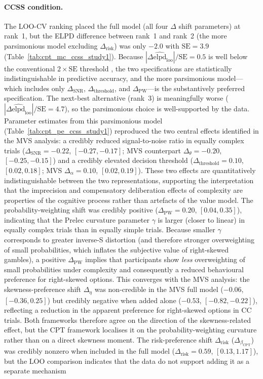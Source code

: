 \documentclass[man,floatsintext]{apa7}
\begin{document}
\paragraph{CCSS condition.} The LOO-CV ranking placed the full model (all four $\Delta$ shift parameters) at rank~1, but the ELPD difference between rank~1 and rank~2 (the more parsimonious model excluding $\Delta_{\text{risk}}$) was only $-2.0$ with $\mathrm{SE} = 3.9$ (Table~\ref{tab:cpt_mc_ccss_study1}). Because $|\Delta\widehat{\mathrm{elpd}}_{\mathrm{loo}}|/\mathrm{SE} = 0.5$ is well below the conventional $2 \times \mathrm{SE}$ threshold \parencite{vehtari_practical_2017}, the two specifications are statistically indistinguishable in predictive accuracy, and the more parsimonious model---which includes only $\Delta_{\text{SNR}}$, $\Delta_{\text{threshold}}$, and $\Delta_{\text{PW}}$---is the substantively preferred specification. The next-best alternative (rank~3) is meaningfully worse ($|\Delta\widehat{\mathrm{elpd}}_{\mathrm{loo}}|/\mathrm{SE} = 4.7$), so the parsimonious choice is well-supported by the data. Parameter estimates from this parsimonious model (Table~\ref{tab:cpt_pe_ccss_study1}) reproduced the two central effects identified in the MVS analysis: a credibly reduced signal-to-noise ratio in equally complex trials (\textbf{$\Delta_{\text{SNR}} = -0.22$}, $[-0.27, -0.17]$; MVS counterpart $\Delta_\theta = -0.20$, $[-0.25, -0.15]$) and a credibly elevated decision threshold (\textbf{$\Delta_{\text{threshold}} = 0.10$}, $[0.02, 0.18]$; MVS $\Delta_\alpha = 0.10$, $[0.02, 0.19]$). These two effects are quantitatively indistinguishable between the two representations, supporting the interpretation that the imprecision and compensatory deliberation effects of complexity are properties of the cognitive process rather than artefacts of the value model. The probability-weighting shift was credibly positive (\textbf{$\Delta_{\text{PW}} = 0.20$}, $[0.04, 0.35]$), indicating that the Prelec curvature parameter $\gamma$ is larger (closer to linear) in equally complex trials than in equally simple trials. Because smaller $\gamma$ corresponds to greater inverse-S distortion (and therefore stronger overweighting of small probabilities, which inflates the subjective value of right-skewed gambles), a positive $\Delta_{\text{PW}}$ implies that participants show \emph{less} overweighting of small probabilities under complexity and consequently a reduced behavioural preference for right-skewed options. This converges with the MVS analysis: the skewness-preference shift $\Delta_\eta$ was non-credible in the MVS full model ($-0.06$, $[-0.36, 0.25]$) but credibly negative when added alone ($-0.53$, $[-0.82, -0.22]$), reflecting a reduction in the apparent preference for right-skewed options in CC trials. Both frameworks therefore agree on the direction of the skewness-related effect, but the CPT framework localises it on the probability-weighting curvature rather than on a direct skewness moment. The risk-preference shift $\Delta_{\text{risk}}$ ($\Delta_{\beta_{\text{CPT}}}$) was credibly nonzero when included in the full model ($\Delta_{\text{risk}} = 0.59$, $[0.13, 1.17]$), but the LOO comparison indicates that the data do not support adding it as a separate mechanism 
\end{document}
